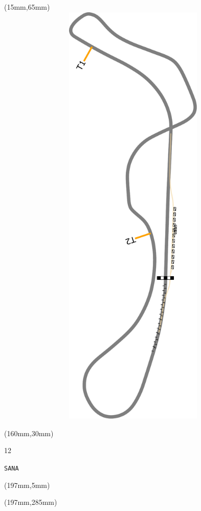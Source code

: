 \begin{textblock*}{185mm}(15mm,65mm)%
\centering
\mbox{\includegraphics[width=185mm,height=210mm,keepaspectratio]{PT/SANA.pdf}}
\end{textblock*}
\begin{textblock*}{40mm}(160mm,30mm)%
\Large
\par{} 
\par12 
\par\hfill\tiny\tt SANA\\
\end{textblock*}
\begin{textblock*}{20mm}(197mm,5mm)%
\fbox{\thepage}
\label{SANA}
\end{textblock*}
\begin{textblock*}{20mm}(197mm,285mm)%
\fbox{\thepage}
\end{textblock*}

